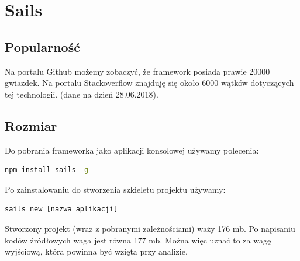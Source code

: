 \documentclass[12pt]{report}
\begin{document}
  \section{Sails}

    \subsection{Popularność}
      Na portalu Github możemy zobaczyć, że framework posiada prawie 20000 gwiazdek.
      Na portalu Stackoverflow znajduję się około 6000 wątków dotyczących tej technologii.
      (dane na dzień 28.06.2018).

    \subsection{Rozmiar}
      Do pobrania frameworka jako aplikacji konsolowej używamy polecenia:
      \begin{lstlisting}[language=bash,numbers=none]
        npm install sails -g
      \end{lstlisting}
      Po zainstalowaniu do stworzenia szkieletu projektu używamy:
      \begin{lstlisting}[language=bash,numbers=none]
        sails new [nazwa aplikacji]
      \end{lstlisting}
      Stworzony projekt (wraz z pobranymi zależnościami) waży 176 mb.
      Po napisaniu kodów źródłowych waga jest równa 177 mb.
      Można więc uznać to za wagę wyjściową, która powinna być wzięta przy analizie.
\end{document}
